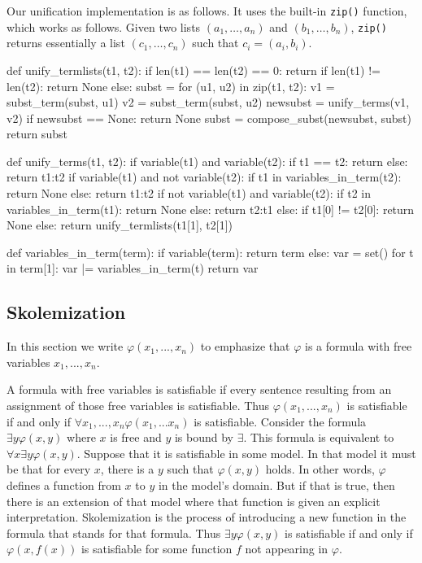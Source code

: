 \documentclass[a4paper,notitlepage]{scrartcl}
\let\phi\varphi
\begin{document}
Our unification implementation is as follows. It uses the built-in
\texttt{zip()} function, which works as follows. Given two lists $(a_1, \ldots,
a_n)$ and $(b_1, \ldots, b_n)$, \texttt{zip()} returns essentially a list
$(c_1, \ldots, c_n)$ such that $c_i = (a_i, b_i)$.

\begin{code}
def unify_termlists(t1, t2):
    if len(t1) == len(t2) == 0:
        return {}
    if len(t1) != len(t2):
        return None
    else:
        subst = {}
        for (u1, u2) in zip(t1, t2):
            v1 = subst_term(subst, u1)
            v2 = subst_term(subst, u2)
            newsubst = unify_terms(v1, v2)
            if newsubst == None:
                return None
            subst = compose_subst(newsubst, subst)
        return subst

def unify_terms(t1, t2):
    if variable(t1) and variable(t2):
        if t1 == t2:
            return {}
        else:
            return {t1:t2}
    if variable(t1) and not variable(t2):
        if t1 in variables_in_term(t2):
            return None
        else:
            return {t1:t2}
    if not variable(t1) and variable(t2):
        if t2 in variables_in_term(t1):
            return None
        else:
            return {t2:t1}
    else:
        if t1[0] != t2[0]:
            return None
        else:
            return unify_termlists(t1[1], t2[1])

def variables_in_term(term):
    if variable(term):
        return {term}
    else:
        var = set()
        for t in term[1]:
            var |= variables_in_term(t)
        return var
\end{code}

\subsection{Skolemization}
In this section we write $\phi(x_1,...,x_n)$ to emphasize that $\phi$ is
   a formula with free variables $x_1,...,x_n$.

A formula with free variables is satisfiable if every sentence resulting
   from an assignment of those free variables is satisfiable.
Thus $\phi(x_1,...,x_n)$ is satisfiable if and only if $\forall x_1,...,
   x_n\phi(x_1,...x_n)$ is satisfiable.
Consider the formula $\exists y \phi(x, y)$ where $x$ is free and $y$
   is bound by $\exists$.
This formula is equivalent to $\forall x\exists y\phi(x, y)$.
Suppose that it is satisfiable in some model.
In that model it must be that for every $x$, there is a $y$ such 
   that $\phi(x,y)$ holds.
In other words, $\phi$ defines a function from $x$ to $y$ in the model's
   domain.
But if that is true, then there is an extension of that model where
   that function is given an explicit interpretation.
Skolemization is the process of introducing a new function in the formula
   that stands for that formula.
Thus $\exists y\phi(x, y)$ is satisfiable if and only
   if $\phi(x, f(x))$ is satisfiable for some function $f$ not appearing
   in $\phi$.
\end{document}
